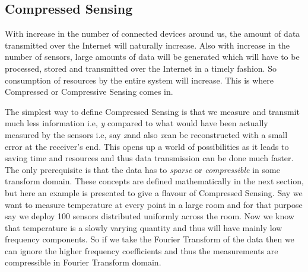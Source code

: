 \documentclass[12pt]{article}
\theoremstyle{definition}
\def\x{\textit{x}\hspace{0.1in}}
\def\y{\textit{y}\hspace{0.1in}}
\begin{document}
  \subsection{Compressed Sensing}
  With increase in the number of connected devices around us, the amount of data transmitted over the Internet will naturally
  increase. Also with increase in the number of sensors, large amounts of data will be generated which will have to be 
  processed, stored and transmitted over the Internet in a timely fashion. So consumption of resources by the entire system
  will increase. This is where Compressed or Compressive Sensing comes in. 
  \par The simplest way to define Compressed Sensing is that we measure and transmit much less information i.e, \y 
  compared to what would have been actually measured by the sensors i.e, say \x and also \x can be reconstructed with a 
  small error at the receiver's end.
  This opens up a world of possibilities as it leads to saving time and resources and thus data transmission can be done
  much faster. The only prerequisite is that the data has to \textit{sparse} or \textit{compressible}
  in some transform domain. These concepts
  are defined mathematically in the next section, but here an example is presented to give a flavour of Compressed Sensing.
  Say we want to measure temperature at every point in a large room and for that purpose say we deploy 100 sensors distributed
  uniformly across the room. Now we know that temperature is a slowly varying quantity and thus will have mainly low
  frequency components. So if we take the Fourier Transform of the data then we can ignore the higher frequency coefficients
  and thus the measurements are compressible in Fourier Transform domain.
 
\end{document}
